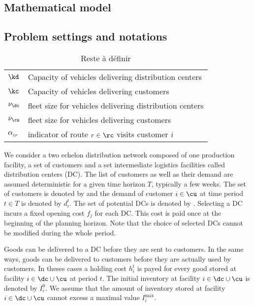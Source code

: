 \documentclass[a4paper,10pt]{article}
\begin{document}
\begin{linenumbers}
\newpage

\section{Mathematical model}

\label{sec:model}

\subsection{Problem settings and notations}

\begin{table}[htbp]
	\centering
	\begin{tabular}{ll}
		\toprule
		$\kd$ & Capacity of vehicles delivering distribution centers\\ 
		$\kc$ & Capacity of vehicles delivering customers\\ 
		$\nu_{\dc}$ & fleet size for vehicles delivering distribution centers\\ 
		$\nu_{\cu}$ & fleet size for vehicles delivering customers\\ 
		$\alpha_{ir}$ & indicator of route $r\in\rc$ visits customer $i$\\
			\bottomrule
		
	\end{tabular}
	\caption{Reste à définir}
	\label{tab:set}
\end{table}



We consider a two echelon distribution network composed of one production facility, a set of customers and a set intermediate logistics facilities called distribution centers (DC). 
The list of customers as well as their demand are assumed deterministic for a given time horizon $T$, typically a few weeks. 
The set of customers is denoted by \cu and the demand of customer $i \in \cu$ at time period $t\in T$ is denoted by $d^t_i$.
The set of potential DCs is denoted by \dc.
Selecting a DC incurs a fixed opening cost $f_j$ for each DC. This cost is paid once at the beginning of the planning horizon. 
Note that the choice of selected DCs cannot be modified during the whole period. 

Goods can be delivered to a DC before they are sent to customers. In the same ways, goods can be delivered to customers before they are actually used by customers. In theses cases a holding cost $h^t_i$ is payed for every good stored at facility $i \in \dc \cup \cu$ at period $t$.
The initial inventory at facility $i \in \dc \cup \cu$ is denoted by $I_i^0$. 
We assume that the amount of inventory stored at facility $i \in \dc \cup \cu$ cannot excess a maximal value $I_i^{\max}$. 


\end{linenumbers}
\end{document}
